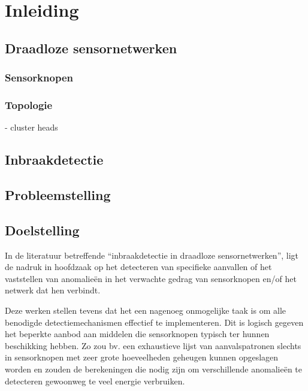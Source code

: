 
\chapter{Inleiding}
\label{inleiding}

\TODO

\section{Draadloze sensornetwerken}

\TODO

\subsection{Sensorknopen}

\TODO

\subsection{Topologie}
\label{subsection:topology}
- cluster heads

\section{Inbraakdetectie}

\TODO

\section{Probleemstelling}

\TODO

\section{Doelstelling}

In de literatuur betreffende ``inbraakdetectie in draadloze sensornetwerken'',
ligt de nadruk in hoofdzaak op het detecteren van specifieke aanvallen of het
vaststellen van anomalie\"en in het verwachte gedrag van sensorknopen en/of het
netwerk dat hen verbindt.

Deze werken stellen tevens dat het een nagenoeg onmogelijke taak is om alle
benodigde detectiemechanismen effectief te implementeren. Dit is logisch
gegeven het beperkte aanbod aan middelen die sensorknopen typisch ter hunnen
beschikking hebben. Zo zou bv. een exhaustieve lijst van aanvalspatronen
slechts in sensorknopen met zeer grote hoeveelheden geheugen kunnen opgeslagen
worden en zouden de berekeningen die nodig zijn om verschillende anomalie\"en
te detecteren gewoonweg te veel energie verbruiken.

